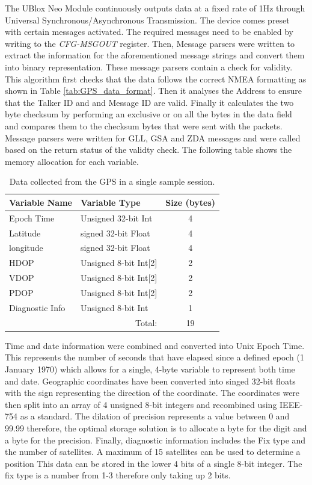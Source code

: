 The UBlox Neo Module continuously outputs data at a fixed rate of 1Hz \cite{UBLOX_M9N_INTERFACE} through Universal Synchronous/Asynchronous Transmission. The device comes preset with certain messages activated. The required messages need to be enabled by writing to the \textit{CFG-MSGOUT} register. Then, Message parsers were written to extract the information for the aforementioned message strings and convert them into binary representation. These message parsers contain a check for validity. This algorithm first checks that the data follows the correct NMEA formatting as shown in Table \ref{tab:GPS_data_format}. Then it analyses the Address to ensure that the Talker ID and and Message ID are valid. Finally it calculates the two byte checksum by performing an exclusive or on all the bytes in the data field and compares them to the checksum bytes that were sent with the packets. Message parsers were written for GLL, GSA and ZDA messages and were called based on the return status of the validty check.
The following table shows the memory allocation for each variable. 
\begin{table}[H]
	\centering
	\caption{Data collected from the GPS in a single sample session.}
	\begin{tabular}{|l|l|c|}
		\hline
		\textbf{Variable Name}  &  \textbf{Variable Type} & \textbf{Size (bytes)}  \\
		\hline
		Epoch Time & Unsigned 32-bit Int & 4  \\
		Latitude & signed 32-bit Float & 4 \\
		longitude & signed 32-bit Float & 4 \\
		HDOP & Unsigned 8-bit Int[2] & 2\\
		VDOP & Unsigned 8-bit Int[2] & 2\\
		PDOP & Unsigned 8-bit Int[2] & 2\\
		Diagnostic Info & Unsigned 8-bit Int & 1 \\
		\hline
		\cline{3-3}
		\multicolumn{2}{r}{Total: } & \multicolumn{1}{c}{19}\\
		\cline{3-3}
		\cline{3-3}
		
	\end{tabular}
	\label{tab:GPS_Data}
\end{table}

Time and date information were combined and converted into Unix Epoch Time. This represents the number of seconds that have elapsed since a defined epoch (1 January 1970) which allows for a single, 4-byte variable to represent both time and date. Geographic coordinates have been converted into singed 32-bit floats with the sign representing the direction of the coordinate. The coordinates were then split into an array of 4 unsigned 8-bit integers and recombined using IEEE-754 as a standard. The dilation of precision represents a value between 0 and 99.99 therefore, the optimal storage solution is to allocate a byte for the digit and a byte for the precision. Finally, diagnostic information includes the Fix type and the number of satellites. A maximum of 15 satellites can be used to determine a position This data can be stored in the lower 4 bits of a single 8-bit integer. The fix type is a number from 1-3 therefore only taking up 2 bits.\par 


